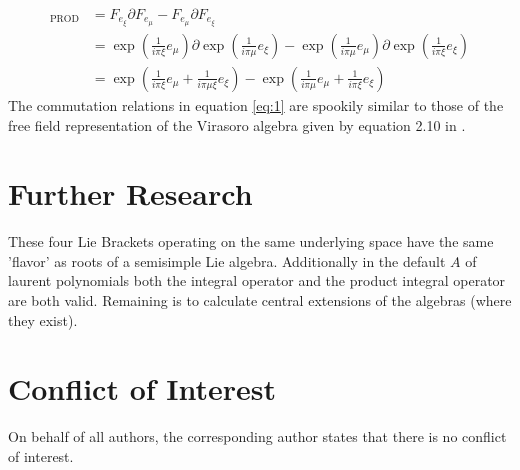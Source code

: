 \documentclass{artjlt}
\newcommand{\?}{\textbackslash}
\begin{document}
      \begin{align}
          [e_\xi, e_\mu]_\text{PROD} &= F_{e_{\xi}} \partial F_{e_{\mu}} - F_{e_{\mu}} \partial F_{e_{\xi}} \nonumber \\
          &= \exp(\frac{1}{i \pi \xi}e_\mu) \partial \exp(\frac{1}{i \pi \mu} e_\xi) - \exp(\frac{1}{i \pi \mu}e_\mu) \partial \exp(\frac{1}{i \pi \xi} e_\xi) \nonumber \\
          &= \exp(\frac{1}{i \pi \xi}e_\mu + \frac{1}{i \pi \mu \xi} e_\xi)- \exp(\frac{1}{i \pi \mu}e_\mu+\frac{1}{i \pi \xi}e_\xi) \label{eq:1}
      \end{align}
      The commutation relations in equation \ref{eq:1} are spookily similar to those of the free field representation of the Virasoro algebra given by equation 2.10 in \cite{teschner2017guidetwodimensionalconformalfield}.
   \section{Further Research}
   These four Lie Brackets operating on the same underlying space have the same 'flavor' as roots of a semisimple Lie algebra. 
   Additionally in the default $A$ of laurent polynomials both the integral operator and the product integral operator are both valid. 
   Remaining is to calculate central extensions of the algebras (where they exist).
\section*{Conflict of Interest}
On behalf of all authors, the corresponding author states that there is no conflict of interest.
\end{document}
